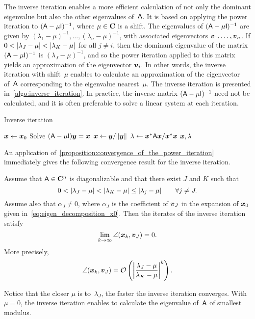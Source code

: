 The inverse iteration enables a more efficient calculation of not only the dominant eigenvalue
but also the other eigenvalues of~$\mat A$.
It is based on applying the power iteration to $(\mat A - \mu \mat I)^{-1}$,
where $\mu \in \complex$ is a shift.
The eigenvalues of $(\mat A - \mu \mat I)^{-1}$ are given by $(\lambda_1 - \mu)^{-1}, \dotsc, (\lambda_n - \mu)^{-1}$,
with associated eigenvectors $\vect v_1, \dotsc, \vect v_n$.
If $0 < \abs{\lambda_J - \mu} < \abs{\lambda_K - \mu}$ for all $j \neq i$,
then the dominant eigenvalue of the matrix $(\mat A - \mu \mat I)^{-1}$ is $(\lambda_J - \mu)^{-1}$,
and so the power iteration applied to this matrix yields an approximation of the eigenvector $\vect v_i$.
In other words,
the inverse iteration with shift~$\mu$ enables to calculate an approximation of the eigenvector of~$\mat A$ corresponding to the eigenvalue nearest~$\mu$.
The inverse iteration is presented in~\cref{algo:inverse_iteration}.
In practice, the inverse matrix $(\mat A - \mu \mat I)^{-1}$ need not be calculated,
and it is often preferable to solve a linear system at each iteration.
\begin{algorithm}
\caption{Inverse iteration}%
\label{algo:inverse_iteration}%
\begin{algorithmic}
\State $\vect x \gets \vect x_0$
    \State Solve $(\mat A - \mu \mat I) \vect y = \vect x$
    \State $\vect x \gets \vect y / \norm{\vect y}$
\EndFor
\State $\lambda \gets \vect x^* \mat A \vect x / \vect x^* \vect x$
\State \Return $\vect x, \lambda$
\end{algorithmic}
\end{algorithm}

An application of~\cref{proposition:convergence_of_the_power_iteration} immediately gives the following convergence result for the inverse iteration.
\begin{proposition}
    Assume that $\mat A \in \complex^n$ is diagonalizable
    and that there exist $J$ and $K$ such that
    \[
        0 < \abs{\lambda_J - \mu} < \abs{\lambda_K - \mu} \leq \abs{\lambda_j - \mu} \qquad \forall j \neq J.
    \]
    Assume also that $\alpha_J \neq 0$,
    where $\alpha_J$ is the coefficient of $\vect v_J$ in the expansion of $\vect x_0$ given in~\eqref{eq:eigen_decomposition_x0}.
    Then the iterates of the inverse iteration satisfy
    \[
        \lim_{k \to \infty} \angle(\vect x_k, \vect v_J) = 0.
    \]
    More precisely,
    \[
        \angle(\vect x_k, \vect v_J) = \mathcal O \left( \abs*{\frac{\lambda_J - \mu}{\lambda_K - \mu}}^k \right).
    \]
\end{proposition}
Notice that the closer $\mu$ is to~$\lambda_J$,
the faster the inverse iteration converges.
With $\mu = 0$, the inverse iteration enables to calculate the eigenvalue of~$\mat A$ of smallest modulus.

